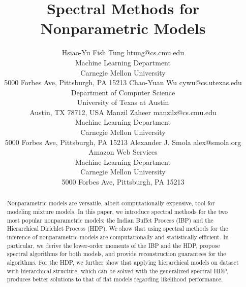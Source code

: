 \documentclass[twoside,11pt]{article}
\begin{document}
\title{Spectral Methods for Nonparametric Models}

\author{\name Hsiao-Yu Fish Tung \email htung@cs.cmu.edu \\
       \addr Machine Learning Department\\
       Carnegie Mellon University\\
       5000 Forbes Ave, Pittsburgh, PA 15213   
       \AND
     \name Chao-Yuan Wu \email cywu@cs.utexas.edu  \\
       \addr Department of Computer Science\\
       University of Texas at Austin\\
       Austin, TX 78712, USA
   \AND
   \name Manzil Zaheer \email manzilz@cs.cmu.edu \\
       \addr Machine Learning Department\\
       Carnegie Mellon University\\
       5000 Forbes Ave, Pittsburgh, PA 15213   
       \AND
       \name Alexander J. Smola \email alex@smola.org \\
       \addr Amazon Web Services\\
       \addr Machine Learning Department\\
       Carnegie Mellon University\\
       5000 Forbes Ave, Pittsburgh, PA 15213          
       }

\editor{}

\maketitle

\begin{abstract}%
Nonparametric models are versatile, albeit computationally expensive, tool 
for modeling mixture models. In this paper, we introduce spectral methods 
for the two most popular nonparametric models: the Indian Buffet Process (IBP) 
and the Hierarchical Dirichlet Process (HDP). We show that using spectral 
methods for the inference of nonparametric models are computationally and 
statistically efficient. In particular, we derive the lower-order moments of 
the IBP and the HDP, propose spectral algorithms for both models, and 
provide reconstruction guarantees for the algorithms. For the HDP, we further 
show that applying hierarchical models on dataset with hierarchical structure, 
which can be solved with the generalized spectral HDP, produces better 
solutions to that of flat models regarding likelihood performance.
\end{abstract}
\end{document}
